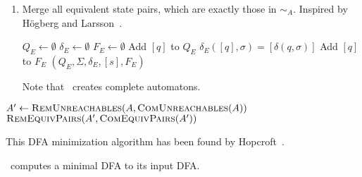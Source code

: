 \begin{enumerate}
	\item Merge all equivalent state pairs, which are exactly those in $\sim_A$. Inspired by Högberg and Larsson~\cite[p. 10]{HL20}.
	
	\vspace{0.2cm}
	\begin{algorithmic}[1] \label{ch:2:minmerge}
            \State $Q_E \gets \emptyset$
            \State $\delta_E \gets \emptyset$
            \State $F_E \gets \emptyset$
                \State Add $[q]$ to $Q_E$ 
                    \State $\delta_E([q], \sigma) = [\delta(q, \sigma)]$
                \EndFor
                    \State Add $[q]$ to $F_E$
                \EndIf
            \EndFor
			\State \Return $(Q_E, \Sigma, \delta_E, [s], F_E)$
		\EndFunction
	\end{algorithmic}
	Note that \RemEq\ creates complete automatons.
\end{enumerate}

\vspace{0.2cm}
\begin{algorithmic}[1] \label{ch:2:minalg}
    \State $A' \gets \textsc{RemUnreachables}(A, \textsc{ComUnreachables}(A))$
    \State \Return $\textsc{RemEquivPairs}(A', \textsc{ComEquivPairs}(A'))$
    \EndFunction
\end{algorithmic}
\vspace{0.2cm}
\noindent This DFA minimization algorithm has been found by Hopcroft~\cite{Hop71}.

\begin{theorem}\label{ch:2:min-alg-correct}\textnormal{\cite[pp. 162-164]{HMU01}}
	\MinAlg\ computes a minimal DFA to its input DFA.
\end{theorem}

